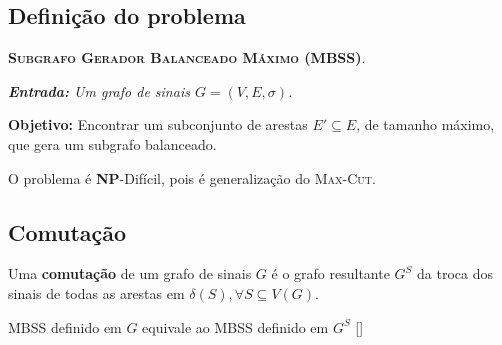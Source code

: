 \documentclass[
12pt,notheorems,hyperref={pdfauthor=whatever}
]{beamer}
\begin{document}
\subsection{Definição do problema}
\begin{frame}
    \textsc{\textbf{\color{primary} Subgrafo Gerador Balanceado Máximo (MBSS)}}.
    \vspace{0.25em}

    {\itshape
    \noindent\textbf{Entrada:} Um grafo de sinais $G=(V,E, \sigma)$.

    \noindent\textbf{Objetivo:} Encontrar um subconjunto de arestas $E' \subseteq E$, de tamanho máximo, que gera um subgrafo balanceado.}

    \pause
    \vspace{1em}
    \begin{minipage}[h][8em][c]{\textwidth}
		\centering%
		
		\small{}
	\end{minipage}
    \pause

    \vspace{1em}
    {\small\alert{O problema é \textbf{NP}-Difícil, pois é generalização do \textsc{Max-Cut}.}}
\end{frame}

\subsection{Comutação}
\begin{frame}
   
    \begin{definition}
        Uma \textbf{comutação} de um grafo de sinais $G$ é o grafo resultante $G^S$ da troca dos sinais de todas as arestas em $\delta(S), \forall S \subseteq V(G)$.
    \end{definition}
    \begin{figure}[h]
        \centering
        \vspace{1em}
        
        \small{}
    \end{figure}

    \pause
    \vspace{1em}
    \alert{MBSS definido em $G$ equivale ao MBSS definido em $G^S$ [\cite{Zaslavsky1982}]}

\end{frame}
\end{document}
